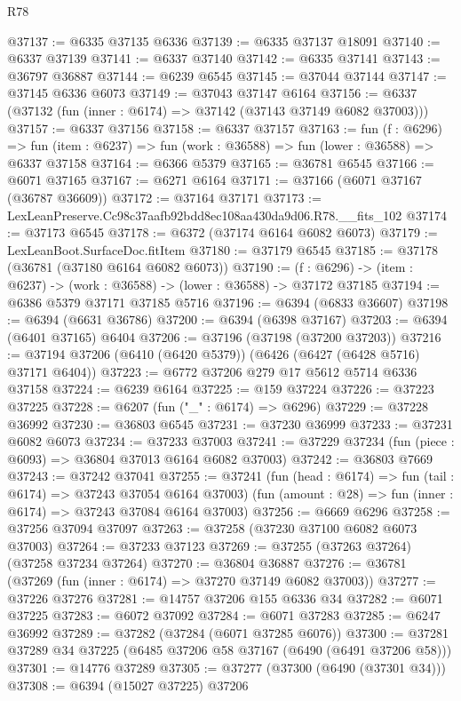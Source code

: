 \begin{lexlean}{R78}
\begin{coremodule}
@37137 := @6335 @37135 @6336
@37139 := @6335 @37137 @18091
@37140 := @6337 @37139
@37141 := @6337 @37140
@37142 := @6335 @37141
@37143 := @36797 @36887
@37144 := @6239 @6545
@37145 := @37044 @37144
@37147 := @37145 @6336 @6073
@37149 := @37043 @37147 @6164
@37156 := @6337 (@37132 (fun (inner : @6174) => @37142 (@37143 @37149 @6082 @37003)))
@37157 := @6337 @37156
@37158 := @6337 @37157
@37163 := fun (f : @6296) =>
  fun (item : @6237) => fun (work : @36588) => fun (lower : @36588) => @6337 @37158
@37164 := @6366 @5379
@37165 := @36781 @6545
@37166 := @6071 @37165
@37167 := @6271 @6164
@37171 := @37166 (@6071 @37167 (@36787 @36609))
@37172 := @37164 @37171
@37173 := LexLeanPreserve.Cc98c37aafb92bdd8ec108aa430da9d06.R78.__fits_102
@37174 := @37173 @6545
@37178 := @6372 (@37174 @6164 @6082 @6073)
@37179 := LexLeanBoot.SurfaceDoc.fitItem
@37180 := @37179 @6545
@37185 := @37178 (@36781 (@37180 @6164 @6082 @6073))
@37190 := (f : @6296) -> (item : @6237) -> (work : @36588) -> (lower : @36588) -> @37172 @37185
@37194 := @6386 @5379 @37171 @37185 @5716
@37196 := @6394 (@6833 @36607)
@37198 := @6394 (@6631 @36786)
@37200 := @6394 (@6398 @37167)
@37203 := @6394 (@6401 @37165) @6404
@37206 := @37196 (@37198 (@37200 @37203))
@37216 := @37194 @37206 (@6410 (@6420 @5379)) (@6426 (@6427 (@6428 @5716) @37171 @6404))
@37223 := @6772 @37206 @279 @17 @5612 @5714 @6336 @37158
@37224 := @6239 @6164
@37225 := @159 @37224
@37226 := @37223 @37225
@37228 := @6207 (fun ("_" : @6174) => @6296)
@37229 := @37228 @36992
@37230 := @36803 @6545
@37231 := @37230 @36999
@37233 := @37231 @6082 @6073
@37234 := @37233 @37003
@37241 := @37229 @37234 (fun (piece : @6093) => @36804 @37013 @6164 @6082 @37003)
@37242 := @36803 @7669
@37243 := @37242 @37041
@37255 := @37241
    (fun (head : @6174) => fun (tail : @6174) => @37243 @37054 @6164 @37003)
    (fun (amount : @28) => fun (inner : @6174) => @37243 @37084 @6164 @37003)
@37256 := @6669 @6296
@37258 := @37256 @37094 @37097
@37263 := @37258 (@37230 @37100 @6082 @6073 @37003)
@37264 := @37233 @37123
@37269 := @37255 (@37263 @37264) (@37258 @37234 @37264)
@37270 := @36804 @36887
@37276 := @36781 (@37269 (fun (inner : @6174) => @37270 @37149 @6082 @37003))
@37277 := @37226 @37276
@37281 := @14757 @37206 @155 @6336 @34
@37282 := @6071 @37225
@37283 := @6072 @37092
@37284 := @6071 @37283
@37285 := @6247 @36992
@37289 := @37282 (@37284 (@6071 @37285 @6076))
@37300 := @37281 @37289 @34 @37225 (@6485 @37206 @58 @37167 (@6490 (@6491 @37206 @58)))
@37301 := @14776 @37289
@37305 := @37277 (@37300 (@6490 (@37301 @34)))
@37308 := @6394 (@15027 @37225) @37206

\end{coremodule}
\end{lexlean}
